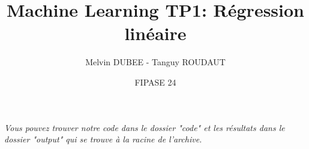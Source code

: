 \documentclass{styles/articleEnsta}
\title{Machine Learning TP1: Régression linéaire}
\author{Melvin DUBEE - Tanguy ROUDAUT \and FIPASE 24}
\begin{document}
\maketitle

\textit{Vous pouvez trouver notre code dans le dossier "code" et les résultats dans le dossier "output" qui se trouve à la racine de l'archive.}




\end{document}

